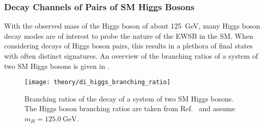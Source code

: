 \subsubsection{Decay Channels of Pairs of SM Higgs Bosons}%

With the observed mass of the Higgs boson of about \SI{125}{\GeV}, many Higgs
boson decay modes are of interest to probe the nature of the EWSB in the
SM. When considering decays of Higgs boson pairs, this results in a plethora of
final states with often distinct signatures. An overview of the branching ratios
of a system of two SM Higgs bosons is given in .

\begin{figure}[htbp]
  \centering

  \texttt{[image: theory/di\_higgs\_branching\_ratio]}

  \caption[Branching ratios of a system of two SM Higgs bosons.]{Branching
    ratios of the decay of a system of two SM Higgs bosons. The Higgs boson
    branching ratios are taken from Ref.~\cite{deFlorian:2016spz_book} and
    assume~$m_{H} = \SI{125.0}{\GeV}$.}%
  \label{fig:hh_branching_ratios}
\end{figure}

